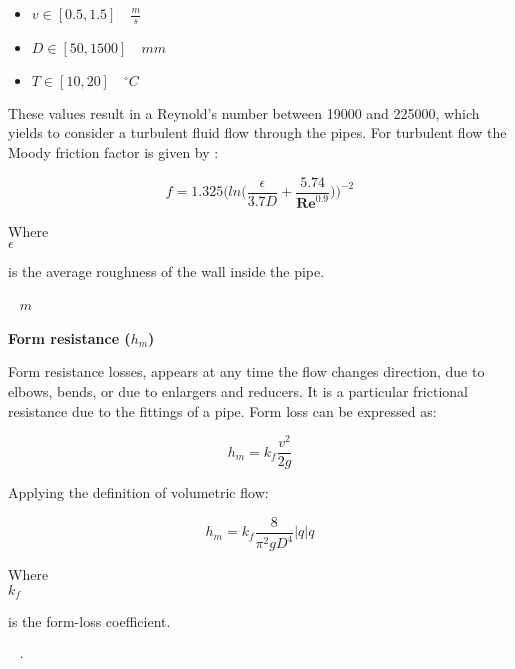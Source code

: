 \begin{itemize}
  \item $ v \in [0.5,1.5] \quad \frac{m}{s}$
  \item $ D \in [50,1500]\quad mm$
  \item $T \in [10,20] \quad ^{\circ} C$
\end{itemize}

These values result in a Reynold's number between 19000 and 225000, which yields to consider a turbulent fluid flow through the pipes. For turbulent flow the 
Moody friction factor is given by \cite{Design_Water}: 

\begin{equation}
  f = 1.325 \bigg(ln\bigg(\frac{\epsilon}{3.7 D}+\frac{5.74}{\pmb{Re}^{0.9}}\bigg)\bigg)^{-2}
  \label{turbulent}
\end{equation}

\begin{minipage}[t]{0.20\textwidth}
Where\\
\hspace*{8mm} $\epsilon$ 
\end{minipage}
\begin{minipage}[t]{0.68\textwidth}
\vspace*{2mm}
is the average roughness of the wall inside the pipe.
 \end{minipage}
\begin{minipage}[t]{0.10\textwidth}
\vspace*{2mm}
\textcolor{White}{te}$\unit{m}$
\end{minipage}

%
\textbf{Form resistance (\texorpdfstring{$h_m$}{})} 
\label{FormResistance}

Form resistance losses, appears at any time the flow changes direction, due to elbows, bends,
or due to enlargers and reducers. It is a particular frictional resistance due to the 
fittings of a pipe. Form loss can be expressed as: 

\begin{equation}
  h_m = k_f \frac{v^2}{2g}
\end{equation}


Applying the definition of volumetric flow:

\begin{equation}
   h_m = k_f \frac{8}{\pi^2gD^4}  |q| q
\label{Formloss}
\end{equation}

 \begin{minipage}[t]{0.20\textwidth}
Where\\
\hspace*{8mm} $k_f$ 
\end{minipage}
\begin{minipage}[t]{0.68\textwidth}
\vspace*{2mm}
is the form-loss coefficient.  
 \end{minipage}
\begin{minipage}[t]{0.10\textwidth}
\vspace*{2mm}
\textcolor{White}{te}$\unit{\cdot}$
\end{minipage}

